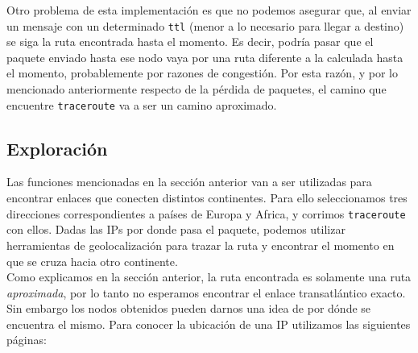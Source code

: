  Otro problema de esta implementaci\'on es que no podemos asegurar que, al enviar un mensaje con un determinado \texttt{ttl} (menor a lo necesario para llegar a destino) se siga la ruta encontrada hasta el momento. Es decir, podr\'ia pasar que el paquete enviado hasta ese nodo vaya por una ruta diferente a la calculada hasta el momento, probablemente por razones de congesti\'on. Por esta raz\'on, y por lo mencionado anteriormente respecto de la p\'erdida de paquetes, el camino que encuentre \texttt{traceroute} va a ser un camino aproximado. \\
 
 
 \subsection{Exploraci\'on}
 
Las funciones mencionadas en la secci\'on anterior van a ser utilizadas para encontrar enlaces que conecten distintos continentes. Para ello seleccionamos tres direcciones correspondientes a pa\'ises de Europa y Africa, y corrimos \texttt{traceroute} con ellos. Dadas las IPs por donde pasa el paquete, podemos utilizar herramientas de geolocalizaci\'on para trazar la ruta y encontrar el momento en que se cruza hacia otro continente.\\

Como explicamos en la secci\'on anterior, la ruta encontrada es solamente una ruta \emph{aproximada}, por lo tanto no esperamos encontrar el enlace transatl\'antico exacto. Sin embargo los nodos obtenidos pueden darnos una idea de por d\'onde se encuentra el mismo. Para conocer la ubicaci\'on de una IP utilizamos las siguientes p\'aginas: 